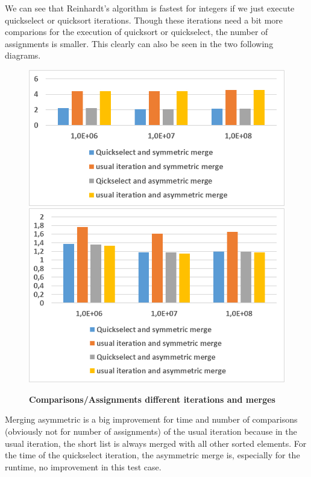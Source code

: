 \documentclass[11pt,pdftex,a4paper, twocolumn]{article}
\begin{document}
We can see that Reinhardt’s algorithm is fastest for integers if we just execute quickselect or quicksort iterations. Though these iterations need a bit more comparions for the execution of quicksort or quickselect, the number of assignments is smaller. This clearly can also be seen in the two following diagrams. \\
\begin{figure}[H]
\includegraphics[width=\linewidth]{Diagramm-Bilder/diff-iterationsAndMerges-assignments.JPG} \\
\includegraphics[width=\linewidth]{Diagramm-Bilder/diff-iterationsAndMerges-comparisons.JPG} \\
\caption{\textbf{Comparisons/Assignments different iterations and merges}} \label{fig:diff-iterationsAndMerges-assignAndComp}
\end{figure}
Merging asymmetric is a big improvement for time and number of comparisons (obviously not for number of assignments) of the usual iteration because in the usual iteration, the short list is always merged with all other sorted elements. For the time of the quickselect iteration, the asymmetric merge is, especially for the runtime, no improvement in this test case. \\
\end{document}
